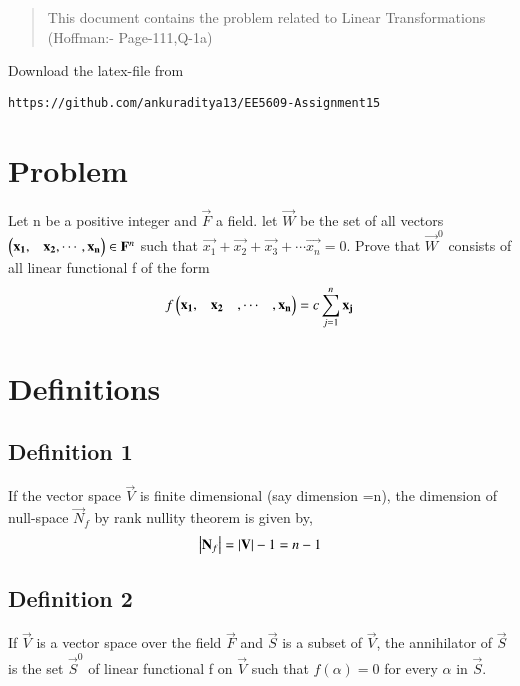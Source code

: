 \documentclass[journal,12pt,twocolumn]{IEEEtran}
\begin{document}
\begin{abstract}
This document contains the problem related to Linear Transformations (Hoffman:- Page-111,Q-1a) 
\end{abstract}
Download the latex-file from 
\begin{lstlisting}
https://github.com/ankuraditya13/EE5609-Assignment15
\end{lstlisting}

\section{Problem}
Let n be a positive integer and $\vec{F}$ a field. let $\vec{W}$ be the set of all vectors $\begin{pmatrix}\mathbf{x_1},&\mathbf{x_2},\cdots ,\mathbf{x_n}\end{pmatrix} \in \mathbf{F}^n$ such that $\vec{x_1}+\vec{x_2}+\vec{x_3}+\cdots \vec{x_n} = 0$. Prove that $\vec{W}^0$ consists of all linear functional f of the form
\begin{align}
f\begin{pmatrix}\mathbf{x_1},&\mathbf{x_2}&,\cdots &,\mathbf{x_n}\end{pmatrix} = c\sum_{j=1}^{n}\mathbf{x_j}
\end{align}
\section{Definitions}
\subsection{Definition 1}
If the vector space $\vec{V}$ is finite dimensional (say dimension =n), the dimension of null-space $\vec{N}_f$ by rank nullity theorem is given by,
\begin{align}
\left\vert\mathbf{N}_f\right\vert  = \left\vert\mathbf{V}\right\vert - 1 = n - 1
\end{align}  
\subsection{Definition 2}
If $\vec{V}$ is a vector space over the field $\vec{F}$ and $\vec{S}$ is a subset of $\vec{V}$, the annihilator of $\vec{S}$ is the set $\vec{S}^0$ of linear functional f on $\vec{V}$ such that $f(\alpha) = 0$ for every $\alpha$ in $\vec{S}$. 
\end{document}
